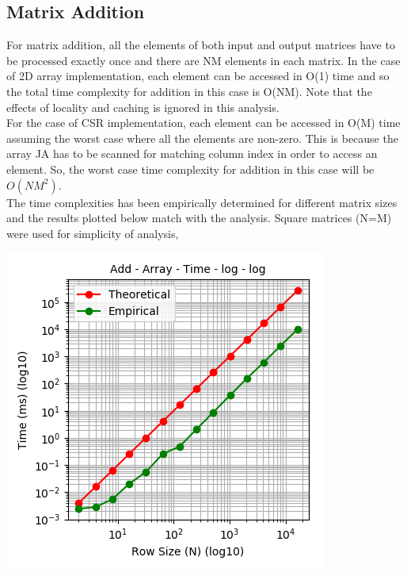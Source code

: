 \documentclass[11pt,a4paper,oneside]{article}
\begin{document}
    \subsection{Matrix Addition}
    For matrix addition, all the elements of both input and output matrices have to be processed exactly once and there are NM elements in each matrix. In the case of 2D array implementation, each element can be accessed in O(1) time and so the total time complexity for addition in this case is O(NM). Note that the effects of locality and caching is ignored in this analysis. \\
    \newline
    For the case of CSR implementation, each element can be accessed in O(M) time assuming the worst case where all the elements are non-zero. This is because the array JA has to be scanned for matching column index in order to access an element. So, the worst case time complexity for addition in this case will be $O(NM^2)$. \\   
    \newline
    The time complexities has been empirically determined for different matrix sizes and the results plotted below match with the analysis. Square matrices (N=M) were used for simplicity of analysis,
    
    \begin{center}
    	\includegraphics[scale=0.6]{3.png}		
    \end{center}
    
\end{document}
